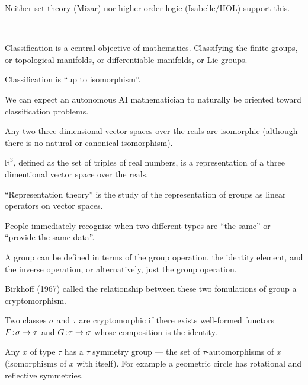 {\vfill
Neither set theory (Mizar) nor higher order logic (Isabelle/HOL) support this.


~ \hfill\unnamed
    {
    }{
      }
\hfill ~


Classification is a central objective of mathematics.  Classifying the finite groups, or topological manifolds, or differentiable manifolds, or Lie groups.

\vfill
Classification is ``up to isomorphism''.

\vfill
We can expect an autonomous AI mathematician to naturally be oriented toward classification problems.


Any two three-dimensional vector spaces over the reals are isomorphic (although there is no natural or canonical isomorphism).

\vfill
$\mathbb{R}^3$, defined as the set of triples of real numbers, is a representation of a three dimentional vector space over the reals.

\vfill
``Representation theory'' is the study of the representation of groups as linear operators on vector spaces.


People immediately recognize when two different types are ``the same'' or ``provide the same data''.

\vfill
A group can be defined in terms of the group operation, the identity element, and the inverse operation, or alternatively, just
the group operation.

\vfill
Birkhoff (1967) called the relationship between these two fomulations of group a cryptomorphism.

\vfill
Two classes $\sigma$ and $\tau$ are cryptomorphic if there exists well-formed functors $F\!:\!\sigma \rightarrow \tau$
and $G\!:\!\tau \rightarrow \sigma$ whose composition is the identity.


Any $x$ of type $\tau$ has a $\tau$ symmetry group --- the set of $\tau$-automorphisms of $x$ (isomorphisms of $x$ with itself).  For example a geometric
circle has rotational and reflective symmetries.

}
